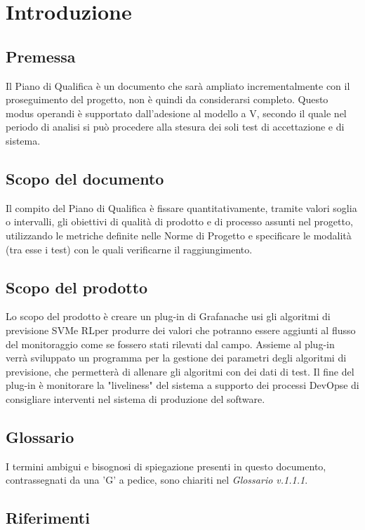 \section{Introduzione}
	\subsection{Premessa}
	Il Piano di Qualifica è un documento che sarà ampliato incrementalmente con il proseguimento del progetto\glo, non è quindi da considerarsi completo. Questo modus operandi è supportato dall'adesione al modello a V, secondo il quale nel periodo di analisi si può procedere alla stesura dei soli test di accettazione e di sistema.
	
	\subsection{Scopo del documento}
	Il compito del Piano di Qualifica è fissare quantitativamente, tramite valori soglia o intervalli, gli obiettivi di qualità di prodotto
	e di processo assunti nel progetto, utilizzando le metriche definite nelle Norme di Progetto e specificare le modalità (tra esse
	i test) con le quali verificarne il raggiungimento.

	\subsection{Scopo del prodotto}
	Lo scopo del prodotto è creare un plug-in di Grafana\glosp che usi gli algoritmi di previsione SVM\glosp e RL\glosp per produrre dei valori che potranno essere aggiunti al flusso del monitoraggio come se fossero stati rilevati dal campo. Assieme al plug-in verrà sviluppato un programma per la gestione dei parametri degli algoritmi di previsione, che permetterà di allenare gli algoritmi con dei dati di test. Il fine del plug-in è monitorare la "liveliness" del sistema a supporto dei processi DevOps\glosp e di consigliare interventi nel sistema di produzione del software.
	
	\subsection{Glossario}
	I termini ambigui e bisognosi di spiegazione presenti in questo documento, contrassegnati da una 'G' a pedice, sono chiariti nel \textit{Glossario v.1.1.1}.
	
	\subsection{Riferimenti}
